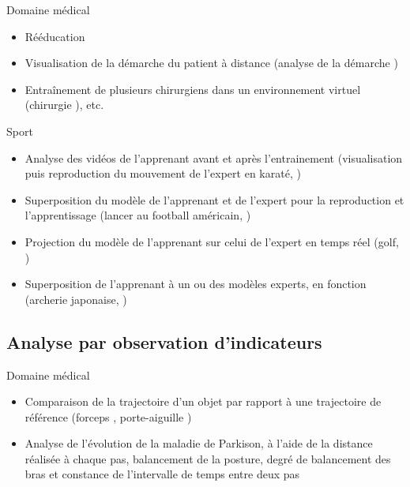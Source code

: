     \begin{frame}{\subsecname}
        \begin{block}{Domaine médical}
            \begin{itemize}[label=$\bullet$]
                \item Rééducation
                \item Visualisation de la démarche du patient à distance (analyse de la démarche )
                \item Entraînement de plusieurs chirurgiens dans un environnement virtuel (chirurgie ), etc.
            \end{itemize}
        \end{block}
    \end{frame}
    
    \begin{frame}{\subsecname}
        \begin{block}{Sport}
            \begin{itemize}[label=$\bullet$]
                \item Analyse des vidéos de l'apprenant avant et après l'entrainement (visualisation puis reproduction du mouvement de l'expert en karaté, )
                \item Superposition du modèle de l'apprenant et de l'expert pour la reproduction et l'apprentissage (lancer au football américain, )
                \item Projection du modèle de l'apprenant sur celui de l'expert en temps réel (golf, )
                \item Superposition de l'apprenant à un ou des modèles experts, en fonction (archerie japonaise, )
            \end{itemize}
        \end{block}
    \end{frame}
    
    \subsection{Analyse par observation d'indicateurs}
    \begin{frame}{\subsecname}
        \begin{block}{Domaine médical}
            \begin{itemize}[label=$\bullet$]
                \item Comparaison de la trajectoire d'un objet par rapport à une trajectoire de référence (forceps , porte-aiguille )
                \item Analyse de l'évolution de la maladie de Parkison, à l'aide de la distance réalisée à chaque pas, balancement de la posture, degré de balancement des bras et constance de l'intervalle de temps entre deux pas 
            \end{itemize}
        \end{block}
    \end{frame}
    
